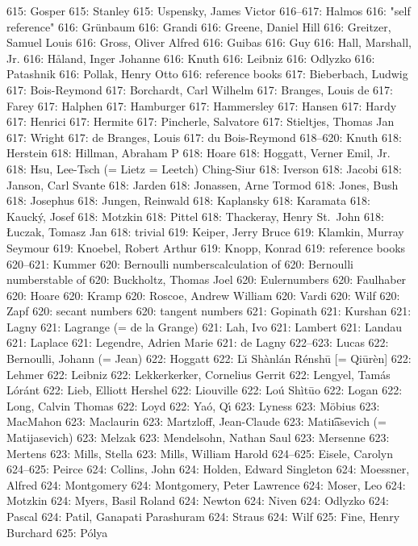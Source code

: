 615: Gosper
615: Stanley
615: Uspensky, James Victor
616--617: Halmos
616: "self reference"
616: Gr\"unbaum
616: Grandi
616: Greene, Daniel Hill
616: Greitzer, Samuel Louis
616: Gross, Oliver Alfred
616: Guibas
616: Guy
616: Hall, Marshall, Jr.
616: H{\aa}land, Inger Johanne
616: Knuth
616: Leibniz
616: Odlyzko
616: Patashnik
616: Pollak, Henry Otto
616: reference books
617: Bieberbach, Ludwig
617: Bois-Reymond
617: Borchardt, Carl Wilhelm
617: Branges, Louis de
617: Farey
617: Halphen
617: Hamburger
617: Hammersley
617: Hansen
617: Hardy
617: Henrici
617: Hermite
617: Pincherle, Salvatore
617: Stieltjes, Thomas Jan
617: Wright
617: de Branges, Louis
617: du Bois-Reymond
618--620: Knuth
618: Herstein
618: Hillman, Abraham P
618: Hoare
618: Hoggatt, Verner Emil, Jr.
618: Hsu, Lee-Tsch (= Lietz = Leetch) Ching-Siur
618: Iverson
618: Jacobi
618: Janson, Carl Svante
618: Jarden
618: Jonassen, Arne Tormod
618: Jones, Bush
618: Josephus
618: Jungen, Reinwald
618: Kaplansky
618: Karamata
618: Kauck\'y, Josef
618: Motzkin
618: Pittel
618: Thackeray, Henry St.~John
618: \L uczak, Tomasz Jan
618: trivial
619: Keiper, Jerry Bruce
619: Klamkin, Murray Seymour
619: Knoebel, Robert Arthur
619: Knopp, Konrad
619: reference books
620--621: Kummer
620: Bernoulli numbers\sub calculation of
620: Bernoulli numbers\sub table of
620: Buckholtz, Thomas Joel
620: Euler\sub numbers
620: Faulhaber
620: Hoare
620: Kramp
620: Roscoe, Andrew William
620: Vardi
620: Wilf
620: Zapf
620: secant numbers
620: tangent numbers
621: Gopinath
621: Kurshan
621: Lagny
621: Lagrange (= de la Grange)
621: Lah, Ivo
621: Lambert
621: Landau
621: Laplace
621: Legendre, Adrien Marie
621: de Lagny
622--623: Lucas
622: Bernoulli, Johann (= Jean)
622: Hoggatt
622: L\u{\i} Sh\`anl\'an R\'ensh\=u [= Qi\=ur\`en]
622: Lehmer
622: Leibniz
622: Lekkerkerker, Cornelius Gerrit
622: Lengyel, Tam\'as L\'or\'ant
622: Lieb, Elliott Hershel
622: Liouville
622: Lo\'u Sh\`it\=uo
622: Logan
622: Long, Calvin Thomas
622: Loyd
622: Ya\'o, Q\'{\i}
623: Lyness
623: M\"obius
623: MacMahon
623: Maclaurin
623: Martzloff, Jean-Claude
623: Mati{\t\i}asevich (= Matijasevich)
623: Melzak
623: Mendelsohn, Nathan Saul
623: Mersenne
623: Mertens
623: Mills, Stella
623: Mills, William Harold
624--625: Eisele, Carolyn
624--625: Peirce
624: Collins, John
624: Holden, Edward Singleton
624: Moessner, Alfred
624: Montgomery
624: Montgomery, Peter Lawrence
624: Moser, Leo
624: Motzkin
624: Myers, Basil Roland
624: Newton
624: Niven
624: Odlyzko
624: Pascal
624: Patil, Ganapati Parashuram
624: Straus
624: Wilf
625: Fine, Henry Burchard
625: P\'olya
